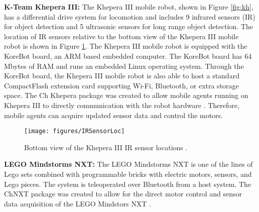       \textbf{K-Team Khepera III:} 
      The Khepera III mobile robot, shown in Figure \ref{fig:kh}, has a 
        differential drive system for locomotion and includes 9 infrared sensors 
        (IR) for object detection and 5 ultrasonic sensors for long range object 
        detection.
      The location of IR sensors relative to the bottom view of the Khepera III 
        mobile robot is shown in Figure \ref{fig:khir}.
      The Khepera III mobile robot is equipped with the KoreBot board, an ARM 
        based embedded computer.
      The KoreBot board has 64 Mbytes of RAM and runs an embedded Linux 
        operating system.
      Through the KoreBot board, the Khepera III mobile robot is also able to 
        host a standard CompactFlash extension card supporting Wi-Fi, Bluetooth, 
        or extra storage space.
      The Ch Khepera package was created to allow mobile agents running on Khepera III
        to directly communication with the robot hardware \cite{ielrobots_webpage}.
      Therefore, mobile agents can acquire updated sensor data and control the motors.
      \begin{figure}%
        \centerline{\texttt{[image: figures/IRSensorLoc]}}
        \caption{Bottom view of the Khepera III IR sensor locations
          \cite{KheperaIIIUserManual}.}
        \label{fig:khir}
      \end{figure}

      \textbf{LEGO Mindstorms NXT:} 
      The LEGO Mindstorms NXT is one of the lines of Lego sets combined with
        programmable bricks with electric motors, sensors, and Lego pieces.
      The system is teleoperated over Bluetooth from a host system.
      The ChNXT package was created to allow for the direct motor control and 
        sensor data acquisition of the LEGO Mindstors NXT \cite{ielrobots_webpage}.

